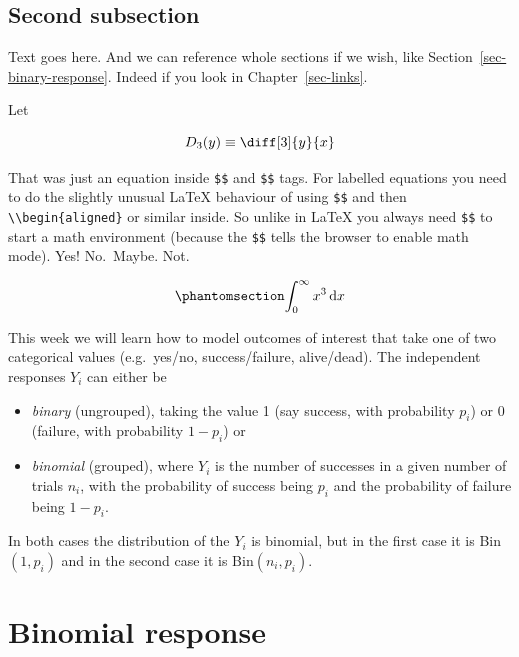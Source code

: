 \documentclass[
  a4paper,
  DIV=11,
  numbers=noendperiod,
  oneside]{scrreport}
\newcommand{\dx}{\,\text{d}x}
\begin{document}
\subsection{Second subsection}\label{second-subsection}

Text goes here. And we can reference whole sections if we wish, like
Section~\ref{sec-binary-response}. Indeed if you look in
Chapter~\ref{sec-links}.

Let

\[D_3(y) \equiv \diff[3]{y}{x}\]

That was just an equation inside \texttt{\$\$} and \texttt{\$\$} tags.
For labelled equations you need to do the slightly unusual LaTeX
behaviour of using \texttt{\$\$} and then
\texttt{\textbackslash{}\textbackslash{}begin\{aligned\}} or similar
inside. So unlike in LaTeX you always need \texttt{\$\$} to start a math
environment (because the \texttt{\$\$} tells the browser to enable math
mode). Yes! No.~Maybe. Not.

\begin{equation}\phantomsection\label{eq-AROC}{
\begin{aligned}
\int_0^{\infty} x^3 \dx
\end{aligned}
}\end{equation}

This week we will learn how to model outcomes of interest that take one
of two categorical values (e.g.~yes/no, success/failure, alive/dead).
The independent responses \(Y_i\) can either be

\begin{itemize}
\item
  \emph{binary} (ungrouped), taking the value 1 (say success, with
  probability \(p_i\)) or 0 (failure, with probability \(1-p_i\)) or
\item
  \emph{binomial} (grouped), where \(Y_i\) is the number of successes in
  a given number of trials \(n_i\), with the probability of success
  being \(p_i\) and the probability of failure being \(1-p_i\).
\end{itemize}

In both cases the distribution of the \(Y_i\) is binomial, but in the
first case it is Bin\((1,p_i)\) and in the second case it is
Bin\((n_i,p_i)\).

\section{Binomial response}\label{binomial-response}
\end{document}
